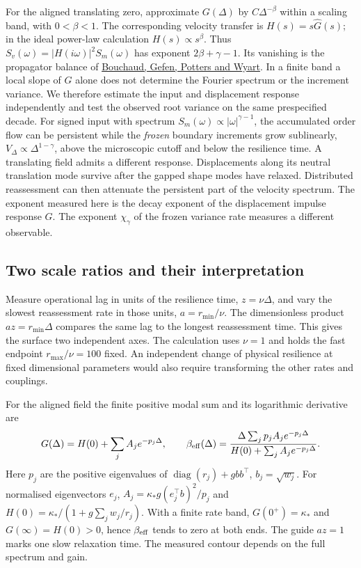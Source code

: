 \documentclass[11pt]{article}
\begin{document}
For the aligned translating zero, approximate \(G(\Delta)\) by
\(C\Delta^{-\beta}\) within a scaling band, with \(0<\beta<1\).
The corresponding velocity transfer is \(H(s)=s\widehat G(s)\);
in the ideal power-law calculation \(H(s)\propto s^\beta\). Thus
\(S_v(\omega)=|H(i\omega)|^2 S_m(\omega)\) has exponent
\(2\beta+\gamma-1\). Its vanishing is the propagator balance of
\href{https://arxiv.org/abs/cond-mat/0307332}{Bouchaud, Gefen, Potters and Wyart}.
In a finite band a local slope of \(G\) alone does not determine the
Fourier spectrum or the increment variance. We therefore estimate the
input and displacement response independently and test the observed
root variance on the same prespecified decade.
For signed input with spectrum \(S_m(\omega)\propto|\omega|^{\gamma-1}\),
the accumulated order flow can be persistent while the \emph{frozen}
boundary increments grow sublinearly, \(V_\Delta\propto\Delta^{1-\gamma}\),
above the microscopic cutoff and below the resilience time.
A translating field admits a different response. Displacements along its
neutral translation mode survive after the gapped shape modes have relaxed.
Distributed reassessment can then attenuate the persistent part of the
velocity spectrum. The exponent measured here is the decay exponent of the
displacement impulse response \(G\). The exponent \(\chi_\gamma\) of the
frozen variance rate measures a different observable.

\subsection{Two scale ratios and their interpretation}
Measure operational lag in units of the resilience time, \(z=\nu\Delta\),
and vary the slowest reassessment rate in those units,
\(a=r_{\min}/\nu\). The dimensionless product \(az=r_{\min}\Delta\)
compares the same lag to the longest reassessment time. This gives the
surface two independent axes. The calculation uses \(\nu=1\) and holds the
fast endpoint \(r_{\max}/\nu=100\) fixed. An independent change of physical
resilience at fixed dimensional parameters would also require transforming
the other rates and couplings.

For the aligned field the finite positive modal sum and its logarithmic
derivative are
\begin{equation}
 G(\Delta)=H(0)+\sum_j A_j e^{-p_j\Delta},\qquad
 \beta_{\rm eff}(\Delta)=
 \frac{\Delta\sum_j p_j A_j e^{-p_j\Delta}}
      {H(0)+\sum_j A_j e^{-p_j\Delta}} .
 \label{eq:window-beta}
\end{equation}
Here \(p_j\) are the positive eigenvalues of
\(\operatorname{diag}(r_j)+g b b^\top\), \(b_j=\sqrt{w_j}\).
For normalised eigenvectors \(e_j\), \(A_j=\kappa_*g(e_j^\top b)^2/p_j\)
and \(H(0)=\kappa_*/(1+g\sum_j w_j/r_j)\). With a finite rate band,
\(G(0^+)=\kappa_*\) and \(G(\infty)=H(0)>0\), hence \(\beta_{\rm eff}\)
tends to zero at both ends. The guide \(az=1\) marks one slow relaxation
time. The measured contour depends on the full spectrum and gain.
\end{document}
